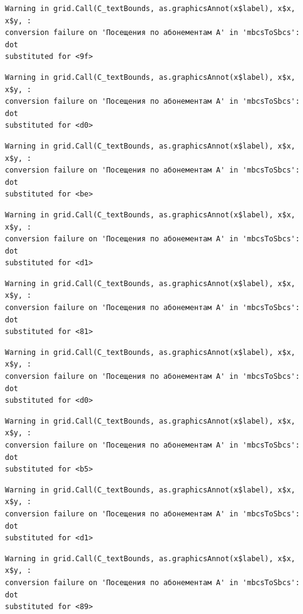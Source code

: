 \documentclass[
  letterpaper,
  DIV=11,
  numbers=noendperiod]{scrartcl}
\begin{document}
\begin{verbatim}
Warning in grid.Call(C_textBounds, as.graphicsAnnot(x$label), x$x, x$y, :
conversion failure on 'Посещения по абонементам А' in 'mbcsToSbcs': dot
substituted for <9f>
\end{verbatim}

\begin{verbatim}
Warning in grid.Call(C_textBounds, as.graphicsAnnot(x$label), x$x, x$y, :
conversion failure on 'Посещения по абонементам А' in 'mbcsToSbcs': dot
substituted for <d0>
\end{verbatim}

\begin{verbatim}
Warning in grid.Call(C_textBounds, as.graphicsAnnot(x$label), x$x, x$y, :
conversion failure on 'Посещения по абонементам А' in 'mbcsToSbcs': dot
substituted for <be>
\end{verbatim}

\begin{verbatim}
Warning in grid.Call(C_textBounds, as.graphicsAnnot(x$label), x$x, x$y, :
conversion failure on 'Посещения по абонементам А' in 'mbcsToSbcs': dot
substituted for <d1>
\end{verbatim}

\begin{verbatim}
Warning in grid.Call(C_textBounds, as.graphicsAnnot(x$label), x$x, x$y, :
conversion failure on 'Посещения по абонементам А' in 'mbcsToSbcs': dot
substituted for <81>
\end{verbatim}

\begin{verbatim}
Warning in grid.Call(C_textBounds, as.graphicsAnnot(x$label), x$x, x$y, :
conversion failure on 'Посещения по абонементам А' in 'mbcsToSbcs': dot
substituted for <d0>
\end{verbatim}

\begin{verbatim}
Warning in grid.Call(C_textBounds, as.graphicsAnnot(x$label), x$x, x$y, :
conversion failure on 'Посещения по абонементам А' in 'mbcsToSbcs': dot
substituted for <b5>
\end{verbatim}

\begin{verbatim}
Warning in grid.Call(C_textBounds, as.graphicsAnnot(x$label), x$x, x$y, :
conversion failure on 'Посещения по абонементам А' in 'mbcsToSbcs': dot
substituted for <d1>
\end{verbatim}

\begin{verbatim}
Warning in grid.Call(C_textBounds, as.graphicsAnnot(x$label), x$x, x$y, :
conversion failure on 'Посещения по абонементам А' in 'mbcsToSbcs': dot
substituted for <89>
\end{verbatim}
\end{document}
